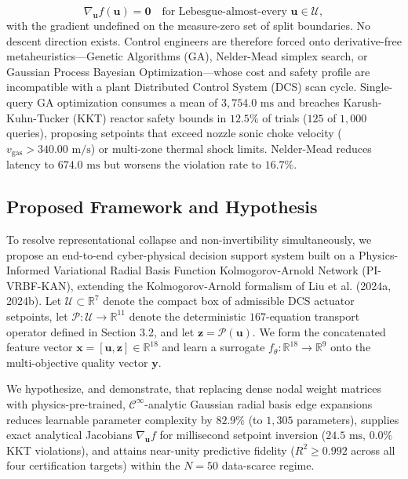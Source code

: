 \documentclass[10pt,journal,onecolumn]{IEEEtran}
\begin{document}
\begin{equation}
\nabla_{\mathbf{u}} f(\mathbf{u}) = \mathbf{0} \quad \text{for Lebesgue-almost-every } \mathbf{u} \in \mathcal{U},
\end{equation}
with the gradient undefined on the measure-zero set of split boundaries. No descent direction exists. Control engineers are therefore forced onto derivative-free metaheuristics—Genetic Algorithms (GA), Nelder-Mead simplex search, or Gaussian Process Bayesian Optimization—whose cost and safety profile are incompatible with a plant Distributed Control System (DCS) scan cycle. Single-query GA optimization consumes a mean of $3,754.0\text{ ms}$ and breaches Karush-Kuhn-Tucker (KKT) reactor safety bounds in $12.5\%$ of trials ($125$ of $1,000$ queries), proposing setpoints that exceed nozzle sonic choke velocity ($v_{\text{gas}} > 340.00\text{ m/s}$) or multi-zone thermal shock limits. Nelder-Mead reduces latency to $674.0\text{ ms}$ but worsens the violation rate to $16.7\%$.

\subsection{Proposed Framework and Hypothesis}
To resolve representational collapse and non-invertibility simultaneously, we propose an end-to-end cyber-physical decision support system built on a Physics-Informed Variational Radial Basis Function Kolmogorov-Arnold Network (PI-VRBF-KAN), extending the Kolmogorov-Arnold formalism of Liu et al. (2024a, 2024b). Let $\mathcal{U} \subset \mathbb{R}^7$ denote the compact box of admissible DCS actuator setpoints, let $\mathcal{P}: \mathcal{U} \to \mathbb{R}^{11}$ denote the deterministic $167$-equation transport operator defined in Section 3.2, and let $\mathbf{z} = \mathcal{P}(\mathbf{u})$. We form the concatenated feature vector $\mathbf{x} = [\mathbf{u}, \mathbf{z}] \in \mathbb{R}^{18}$ and learn a surrogate $f_\theta: \mathbb{R}^{18} \to \mathbb{R}^9$ onto the multi-objective quality vector $\mathbf{y}$.

We hypothesize, and demonstrate, that replacing dense nodal weight matrices with physics-pre-trained, $\mathcal{C}^\infty$-analytic Gaussian radial basis edge expansions reduces learnable parameter complexity by $82.9\%$ (to $1,305$ parameters), supplies exact analytical Jacobians $\nabla_{\mathbf{u}} f$ for millisecond setpoint inversion ($24.5\text{ ms}$, $0.0\%$ KKT violations), and attains near-unity predictive fidelity ($R^2 \ge 0.992$ across all four certification targets) within the $N = 50$ data-scarce regime.
\end{document}
